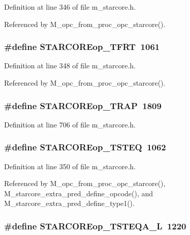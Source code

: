 Definition at line 346 of file m\_\-starcore.h.

Referenced by M\_\-opc\_\-from\_\-proc\_\-opc\_\-starcore().
\subsubsection{\setlength{\rightskip}{0pt plus 5cm}\#define STARCOREop\_\-TFRT~1061}\label{m__starcore_8h_3637949142351c2a099db467b877ebc6}




Definition at line 348 of file m\_\-starcore.h.

Referenced by M\_\-opc\_\-from\_\-proc\_\-opc\_\-starcore().
\subsubsection{\setlength{\rightskip}{0pt plus 5cm}\#define STARCOREop\_\-TRAP~1809}\label{m__starcore_8h_77ac8967808ac0837b1ca890ade7ab95}




Definition at line 706 of file m\_\-starcore.h.
\subsubsection{\setlength{\rightskip}{0pt plus 5cm}\#define STARCOREop\_\-TSTEQ~1062}\label{m__starcore_8h_efb767d0aa6b1416b8d592dbfccbb446}




Definition at line 350 of file m\_\-starcore.h.

Referenced by M\_\-opc\_\-from\_\-proc\_\-opc\_\-starcore(), M\_\-starcore\_\-extra\_\-pred\_\-define\_\-opcode(), and M\_\-starcore\_\-extra\_\-pred\_\-define\_\-type1().
\subsubsection{\setlength{\rightskip}{0pt plus 5cm}\#define STARCOREop\_\-TSTEQA\_\-L~1220}\label{m__starcore_8h_23915b65afaac83e95da171953c0f315}




